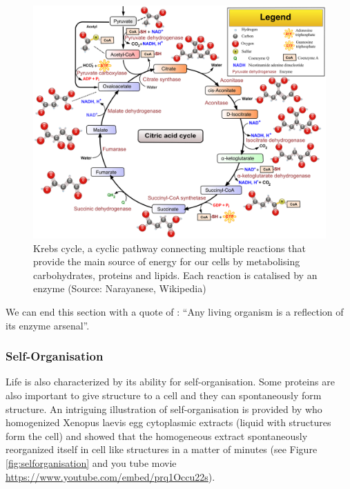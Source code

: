 \documentclass[
  11pt,
]{book}
\begin{document}
\begin{figure}

{\centering \includegraphics[width=0.7\linewidth]{./figs/Citric_acid_cycle_with_aconitate_2} 

}

\caption{Krebs cycle, a cyclic pathway connecting multiple reactions that provide the main source of energy for our cells by metabolising carbohydrates, proteins and lipids. Each reaction is catalised by an enzyme  (Source: Narayanese, Wikipedia)}\label{fig:krebsCycle}
\end{figure}

We can end this section with a quote of \citet{deDuve2002}: ``Any living organism is a reflection of its enzyme arsenal''.

\newpage

\hypertarget{self-organisation}{%
\subsubsection{Self-Organisation}\label{self-organisation}}

Life is also characterized by its ability for self-organisation. Some proteins are also important to give structure to a cell and they can spontaneously form structure.
An intriguing illustration of self-organisation is provided by \citet{Cheng2019} who
homogenized Xenopus laevis egg cytoplasmic extracts (liquid with structures form the cell) and showed that the homogeneous extract spontaneously reorganized itself in cell like structures in a matter of minutes (see Figure \ref{fig:selforganisation} and you tube movie \url{https://www.youtube.com/embed/prq1Occu22s}).
\end{document}
